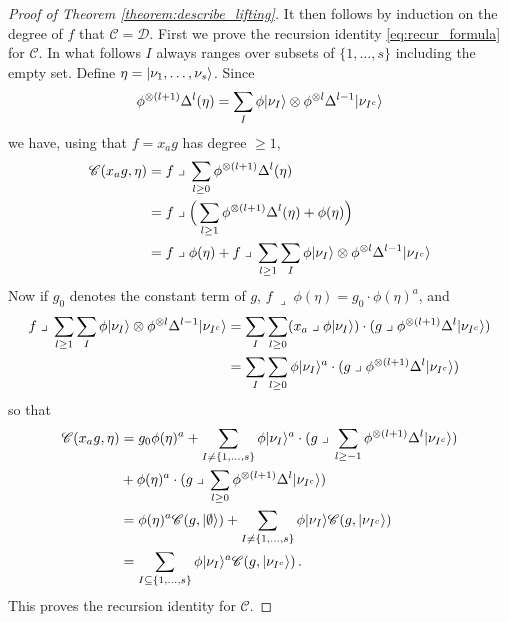 \documentclass[english,letter paper,12pt,reqno]{article}
\DeclarePairedDelimiter\ket{\lvert}{\rangle}
\theoremstyle{example}
\numberwithin{equation}{section}
\def\vacu{\ket{\emptyset}}
\def\contract{\;\lrcorner\;}
\begin{document}
\begin{proof}[Proof of Theorem \ref{theorem:describe_lifting}]
It then follows by induction on the degree of $f$ that $\mathscr{C} = \mathscr{D}$. First we prove the recursion identity \eqref{eq:recur_formula} for $\mathscr{C}$. In what follows $I$ always ranges over subsets of $\{ 1, \ldots, s \}$ including the empty set. Define $\eta = \ket{\nu_1,\ldots,\nu_s}$. Since
\[
\phi^{\otimes(l+1)} \Delta^l( \eta ) = \sum_I \phi \ket{\nu_I} \otimes \phi^{\otimes l} \Delta^{l-1} \ket{\nu_{I^c}}
\]
we have, using that $f = x_a g$ has degree $\ge 1$,
\begin{align*}
\mathscr{C}( x_a g, \eta ) &= f \contract \sum_{l \ge 0} \phi^{\otimes (l+1)} \Delta^l ( \eta )\\
&= f \contract \Big( \sum_{l \ge 1} \phi^{\otimes (l+1)} \Delta^l( \eta ) + \phi( \eta ) \Big)\\
&= f \contract \phi( \eta ) + f \contract \sum_{l \ge 1} \sum_I \phi \ket{\nu_I} \otimes \phi^{\otimes l} \Delta^{l-1} \ket{\nu_{I^c}}
\end{align*}
Now if $g_0$ denotes the constant term of $g$, $f \contract \phi( \eta ) = g_0 \cdot \phi( \eta )^a$, and
\begin{align*}
f \contract \sum_{l \ge 1} \sum_I \phi \ket{\nu_I} \otimes \phi^{\otimes l} \Delta^{l-1} \ket{\nu_{I^c}} &= \sum_I \sum_{l \ge 0} ( x_a \contract \phi\ket{\nu_I} ) \cdot ( g \contract \phi^{\otimes (l+1)} \Delta^l \ket{\nu_{I^c}})\\
&= \sum_I \sum_{l \ge 0} \phi\ket{\nu_I}^a \cdot ( g \contract \phi^{\otimes (l+1)} \Delta^l \ket{\nu_{I^c}})
\end{align*}
so that
\begin{align*}
\mathscr{C}( x_a g, \eta ) &= g_0 \phi( \eta )^a + \sum_{I \neq \{1,\ldots,s\}} \phi \ket{\nu_I}^a \cdot ( g \contract \sum_{l \ge -1} \phi^{\otimes (l+1)} \Delta^l \ket{\nu_{I^c}})\\
&+ \phi( \eta )^a \cdot ( g \contract \sum_{l \ge 0} \phi^{\otimes (l+1)} \Delta^l \ket{\nu_{I^c}})\\
&= \phi( \eta )^a \mathscr{C}(g, \vacu) + \sum_{I \neq \{1,\ldots,s\}} \phi \ket{\nu_I} \mathscr{C}(g, \ket{\nu_{I^c}})\\
&= \sum_{I \subseteq \{ 1,\ldots,s\}} \phi\ket{\nu_I}^a \mathscr{C}( g, \ket{\nu_{I^c}})\,.
\end{align*}
This proves the recursion identity for $\mathscr{C}$. 


\end{proof}
\end{document}
